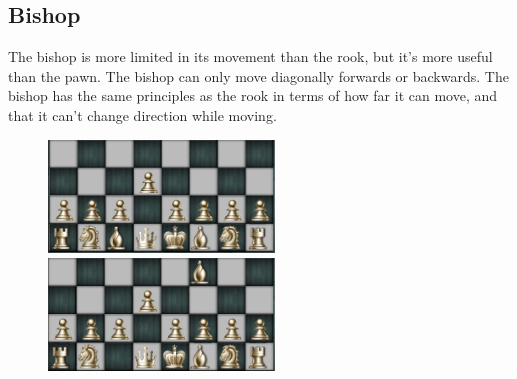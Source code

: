 \documentclass{article}
\begin{document}
\subsection*{Bishop} The bishop is more limited in its movement than the rook, but it’s more useful than the pawn. The bishop can only move diagonally forwards or backwards. The bishop has the same principles as the rook in terms of how far it can move, and that it can’t change direction while moving. 
\begin{figure}[h]
\includegraphics[width=6cm, height=3cm]{bishop1} \includegraphics[width=6cm, height=3cm]{bishop2} 
\end{figure}
\end{document}
